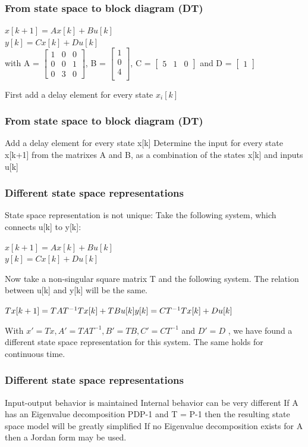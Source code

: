 \begin{frame}
	\frametitle{From state space to block diagram (DT)}
		\begin{center}
			$x[k+1] = A x[k] + B u[k]$ \\
			$y[k] = C x[k] + D u[k] $ \\

	with  A = 
	$\begin{bmatrix}
		1 & 0 & 0 \\
		0 & 0 & 1 \\
		0 & 3 & 0
	\end{bmatrix}$, B = $\begin{bmatrix}
	1\\
	0\\
	4\\
\end{bmatrix}$, C = $\begin{bmatrix}
 5 & 1 & 0
\end{bmatrix}$ and D = $\begin{bmatrix}
1
\end{bmatrix}$ \\
\end{center}
	First add a delay element for every state $x_i[k]$


\end{frame}
\begin{frame}
	\frametitle{From state space to block diagram (DT)}
	Add a delay element for every state x[k]
	Determine the input for every state x[k+1] from the matrixes A and B, as a combination of the states x[k] and inputs u[k]
	
\end{frame}
\begin{frame}
	\frametitle{Different state space representations}
	State space representation is not unique:
	Take the following system, which connects u[k] to y[k]:
		\begin{center}
			$x[k+1] = A x[k] + B u[k]$ \\
			$y[k] = C x[k] + D u[k] $ \\
		\end{center}
	Now take a non-singular square matrix T and the following system. The relation between u[k] and y[k] will be the same.
	\begin{center}
		$Tx[k+1] = TAT^{-1}Tx[k] + TBu[k]\\
		y[k] = C T^{-1}Tx[k] + Du[k]$
	\end{center}
	With $x' = Tx, A' = TAT^{-1},B' = TB,C' = CT^{-1}$ and $D'=D$	,  we have found a different state space representation for this system.
	The same holds for continuous time.
	
\end{frame}
\begin{frame}
	\frametitle{Different state space representations}
	Input-output behavior is maintained
	Internal behavior can be very different
	If A has an Eigenvalue decomposition PDP-1 and T = P-1 then the resulting state space model will be greatly simplified
	If no Eigenvalue decomposition exists for A then a Jordan form may be used.
	
\end{frame}
